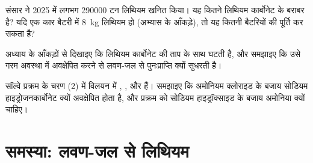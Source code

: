 \begin{exercise}[$\star\star\star$]\label{exo:b1:s-block:10}
संसार ने 2025 में लगभग \num{290000} टन लिथियम खनित किया। यह कितने
लिथियम कार्बोनेट के बराबर है? यदि एक कार बैटरी में \qty{8}{kg}
लिथियम हो (अभ्यास के आँकड़े), तो यह कितनी बैटरियों की पूर्ति कर सकता है?
\end{exercise}

\begin{exercise}[$\star\star\star$]\label{exo:b1:s-block:11}
अध्याय के आँकड़ों से दिखाइए कि लिथियम कार्बोनेट की  ताप के साथ घटती है,
और समझाइए कि उसे गरम अवस्था में अवक्षेपित करने से
लवण-जल से पुनःप्राप्ति क्यों सुधरती है।
\end{exercise}

\begin{exercise}[$\star\star\star$]\label{exo:b1:s-block:12}
सॉल्वे प्रक्रम के चरण (2) में विलयन में ,
,  और  हैं। समझाइए कि अमोनियम क्लोराइड के बजाय सोडियम हाइड्रोजनकार्बोनेट
क्यों अवक्षेपित होता है, और प्रक्रम को सोडियम हाइड्रॉक्साइड के बजाय
अमोनिया क्यों चाहिए।
\end{exercise}

\section{समस्या: लवण-जल से लिथियम}

